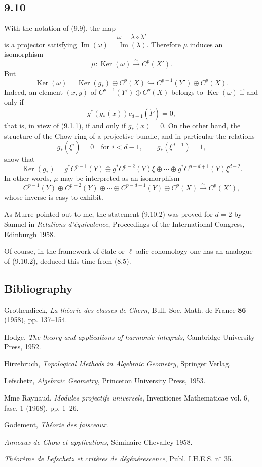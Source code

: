 \documentclass[11pt]{article}
\providecommand{\Ker}{\operatorname{Ker}}
\providecommand{\Ker}{\operatorname{Ker}}
\providecommand{\Ker}{\operatorname{Ker}}
\begin{document}
\subsection*{9.10}

With the notation of (9.9), the map
\[
\omega=\lambda\circ\lambda'
\]
is a projector satisfying $\operatorname{Im}(\omega)=\operatorname{Im}(\lambda)$. Therefore $\mu$ induces an isomorphism
\[
\bar\mu:\Ker(\omega)\xrightarrow{\sim}C^p(X').
\]
But
\[
\Ker(\omega)=\Ker(g_*)\oplus C^p(X)\hookrightarrow C^{p-1}(Y')\oplus C^p(X).
\tag{9.10.1}
\]
Indeed, an element $(x,y)$ of $C^{p-1}(Y')\oplus C^p(X)$ belongs to $\Ker(\omega)$ if and only if
\[
g^*(g_*(x))c_{d-1}(\check F)=0,
\]
that is, in view of (9.1.1), if and only if $g_*(x)=0$. On the other hand, the structure of the Chow ring of a projective bundle, and in particular the relations
\[
g_*(\xi^i)=0\quad\text{for }i<d-1,\qquad g_*(\xi^{d-1})=1,
\]
show that
\[
\Ker(g_*)=g^*C^{p-1}(Y)\oplus g^*C^{p-2}(Y)\xi\oplus\cdots\oplus g^*C^{p-d+1}(Y)\xi^{d-2}.
\]
In other words, $\bar\mu$ may be interpreted as an isomorphism
\[
C^{p-1}(Y)\oplus C^{p-2}(Y)\oplus\cdots\oplus C^{p-d+1}(Y)\oplus C^p(X)
\xrightarrow{\sim}C^p(X'),
\tag{9.10.2}
\]
whose inverse is easy to exhibit.

As Murre pointed out to me, the statement (9.10.2) was proved for $d=2$ by Samuel in \emph{Relations d'équivalence}, Proceedings of the International Congress, Edinburgh 1958.

Of course, in the framework of étale or $\ell$-adic cohomology one has an analogue of (9.10.2), deduced this time from (8.5).

\subsection*{Bibliography}

\begin{enumerate}[label={[\arabic*]}]
\item Grothendieck, \emph{La théorie des classes de Chern}, Bull. Soc. Math. de France \textbf{86} (1958), pp. 137--154.
\item Hodge, \emph{The theory and applications of harmonic integrals}, Cambridge University Press, 1952.
\item Hirzebruch, \emph{Topological Methods in Algebraic Geometry}, Springer Verlag.
\item Lefschetz, \emph{Algebraic Geometry}, Princeton University Press, 1953.
\item Mme Raynaud, \emph{Modules projectifs universels}, Inventiones Mathematicae vol. 6, fasc. 1 (1968), pp. 1--26.
\item[{[TF]}] Godement, \emph{Théorie des faisceaux}.
\item[{[CH]}] \emph{Anneaux de Chow et applications}, Séminaire Chevalley 1958.
\item[{[6]}] \emph{Théorème de Lefschetz et critères de dégénérescence}, Publ. I.H.E.S. n$^\circ$ 35.
\end{enumerate}
\end{document}
